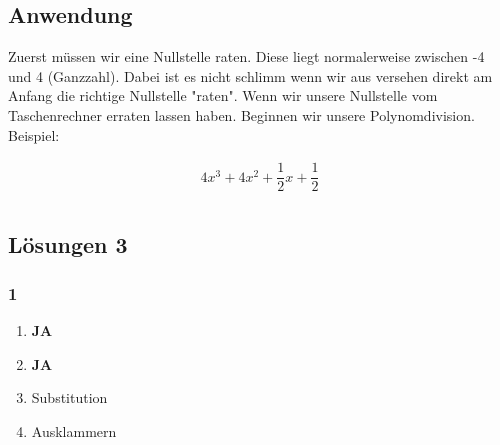 \documentclass[11pt,a4paper]{article}
\begin{document}
\subsection{Anwendung}
Zuerst müssen wir eine Nullstelle raten. Diese liegt normalerweise zwischen -4 und 4 (Ganzzahl). Dabei ist es nicht schlimm wenn wir aus versehen direkt am Anfang die richtige Nullstelle "raten". Wenn wir unsere Nullstelle vom Taschenrechner erraten lassen haben. Beginnen wir unsere Polynomdivision. Beispiel:

\begin{eqnarray}
4x^3 + 4x^2 + \dfrac{1}{2} x + \dfrac{1}{2} \\
\end{eqnarray}

\newpage

\subsection{Lösungen 3}

\subsubsection*{1}

\begin{enumerate}
\item \textbf{JA}
\item \textbf{JA}
\item Substitution
\item Ausklammern
\end{enumerate}
\end{document}
